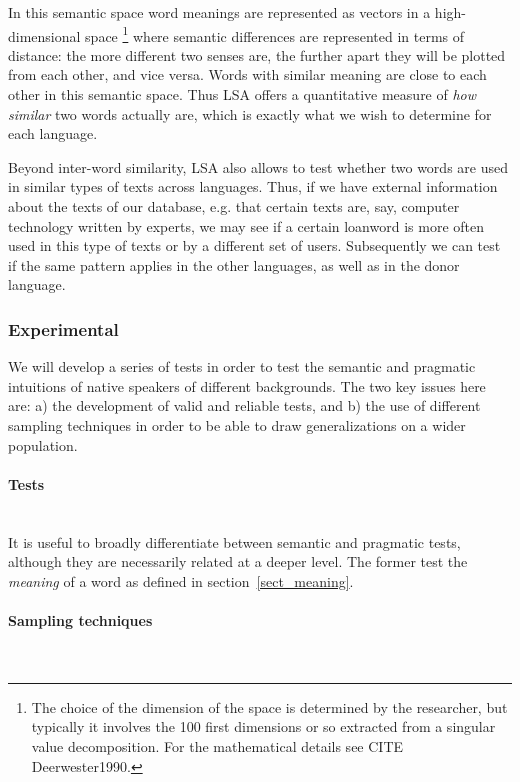\documentclass[a4paper]{article}
\begin{document}
In this semantic space word meanings are represented as vectors in a high-dimensional space%
\footnote{The choice of the dimension of the space is determined by the researcher, but typically it involves the 100 first dimensions or so extracted from a singular value decomposition. For the mathematical details see CITE {Deerwester1990}.} where semantic differences are represented in terms of distance: the more different two senses are, the further apart they will be plotted from each other, and vice versa. Words with similar meaning are close to each other in this semantic space.
Thus LSA offers a quantitative measure of \emph{how similar} two words actually are, which is exactly what we wish to determine for each language.

Beyond inter-word similarity, LSA also allows  to test whether two words are used in similar types of texts across languages.
Thus, if we have external information about the texts of our database, e.g. that certain texts are, say, computer technology written by experts, we may see if a certain loanword is more often used in this type of texts or by a different set of users.
Subsequently we can test if the same pattern applies in the other languages, as well as in the donor language.


\subsubsection{Experimental}

We will develop a series of tests in order to test the semantic and pragmatic intuitions of native speakers of different backgrounds.
The two key issues here are: a) the development of valid and reliable tests, and b) the use of different sampling techniques in order to be able to draw generalizations on a wider population.

\paragraph{Tests}
\hspace{0pt} \\
It is useful to broadly differentiate between semantic and pragmatic tests, although they are necessarily related at a deeper level.
The former test the \emph{meaning} of a word as defined in section~\ref{sect_meaning}.


\paragraph{Sampling techniques}
\hspace{0pt} \\
\end{document}
